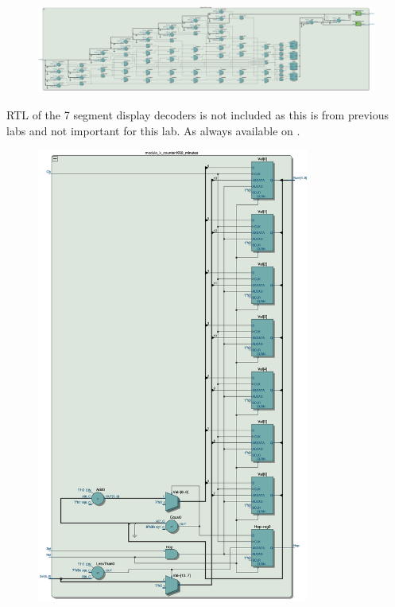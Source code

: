 \documentclass{article}
\begin{document}
\hfill

\begin{figure}[h]
    \centering
    \includegraphics[width=1\textwidth]{Figures/Part2_RTL_BCD_display.jpg}
    \label{fig:p2_RTL_TLE}
\end{figure}

RTL of the 7 segment display decoders is not included as this is from previous labs and not important for this lab. As always available on .

\clearpage
\begin{figure}[h]
    \centering
    \includegraphics[width=0.8\textwidth]{Figures/Part2_RTL_minute_counter.jpg}
    \label{fig:p2_RTL_TLE}
\end{figure}
\end{document}
